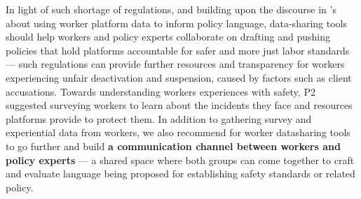 {In light of such shortage of regulations, and building upon the discourse in \citet{policy_probes}'s about using worker platform data to inform policy language, data-sharing tools should help workers and policy experts collaborate on drafting and pushing policies that hold platforms accountable for safer and more just labor standards --- such regulations can provide further resources and transparency for workers experiencing unfair deactivation and suspension, caused by factors such as client accusations. 
Towards understanding workers experiences with safety, P2 suggested surveying workers to learn about the incidents they face and resources platforms provide to protect them. 
In addition to gathering survey and experiential data from workers, we also recommend for worker datasharing tools to go further and build \textbf{a communication channel between workers and policy experts} --- a shared space where both groups can come together to craft and evaluate language being proposed for establishing safety standards or related policy.


}

